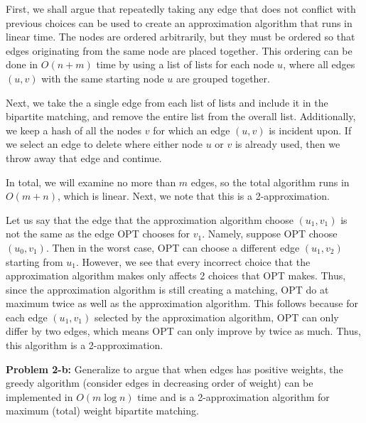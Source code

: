 \documentclass[psamsfonts]{amsart}
\newenvironment{sol}{\vspace{0.25cm}{\large \bfseries Solution:}}{\qedsymbol}
\newenvironment{prob}[1]{\begin{framed}{\large \bfseries Problem #1:}}{\end{framed}}
\begin{document}
\begin{sol}
First, we shall argue that repeatedly taking any edge that does not conflict with previous choices can be used to create an approximation algorithm that runs in linear time. The nodes are ordered arbitrarily, but they must be ordered so that edges originating from the same node are placed together. This ordering can be done in $O(n + m)$ time by using a list of lists for each node $u$, where all edges $(u,v)$ with the same starting node $u$ are grouped together. 

Next, we take the a single edge from each list of lists and include it in the bipartite matching, and remove the entire list from the overall list. Additionally, we keep a hash of all the nodes $v$ for which an edge $(u,v)$ is incident upon. If we select an edge to delete where either node $u$ or $v$ is already used, then we throw away that edge and continue. 

In total, we will examine no more than $m$ edges, so the total algorithm runs in $O(m+n)$, which is linear. Next, we note that this is a 2-approximation. 

Let us say that the edge that the approximation algorithm choose $(u_1, v_1)$ is not the same as the edge OPT chooses for $v_1$. Namely, suppose OPT choose $(u_0, v_1)$. Then in the worst case, OPT can choose a different edge $(u_1, v_2)$ starting from $u_1$. However, we see that every incorrect choice that the approximation algorithm makes only affects 2 choices that OPT makes. Thus, since the approximation algorithm is still creating a matching, OPT do at maximum twice as well as the approximation algorithm. This follows because for each edge $(u_1, v_1)$ selected by the approximation algorithm, OPT can only differ by two edges, which means OPT can only improve by twice as much. Thus, this algorithm is a 2-approximation.
\end{sol}

\begin{prob}{2-b}
Generalize to argue that when edges has positive weights, the greedy algorithm (consider edges in decreasing order of weight) can be implemented in $O(m \log n)$ time and is a 2-approximation algorithm for maximum (total) weight bipartite matching.
\end{prob}
\end{document}
